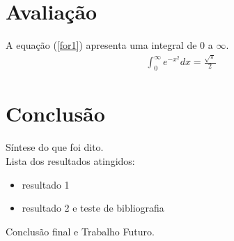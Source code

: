 \documentclass[a4paper,12pt]{article}
\begin{document}
\section{Avaliação}
A equação (\ref{for1})  apresenta uma integral de 0 a $\infty$.
\begin{align}
	\label{for1}	\int_0^\infty e^{-x^2} dx=\frac{\sqrt{\pi}}{2}
\end{align}

\section{Conclusão}
Síntese do que foi dito.\\
Lista dos resultados atingidos:
\begin{itemize}
\item resultado 1
\item resultado 2 e teste de bibliografia \cite{Bulfinch1998}
\end{itemize}
Conclusão final e Trabalho Futuro.



\end{document}
